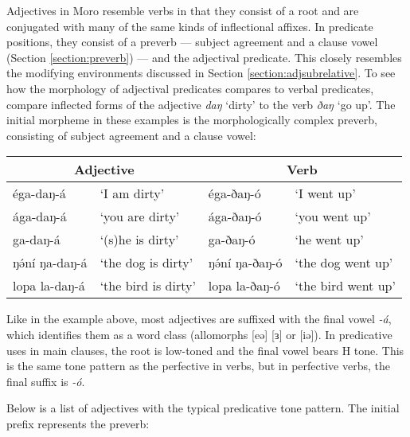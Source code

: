 Adjectives in Moro resemble verbs in that they consist of a root and are conjugated with many of the same kinds of inflectional affixes. In predicate positions, they consist of a preverb --- subject agreement and a clause vowel (Section \ref{section:preverb}) --- and the adjectival predicate. This closely resembles the modifying environments discussed in Section \ref{section:adjsubrelative}. To see how the morphology of adjectival predicates compares to verbal predicates, compare inflected forms of the adjective \textit{daŋ} ‘dirty’ to the verb \textit{ðaŋ} ‘go up’. The initial morpheme in these examples is the morphologically complex preverb, consisting of subject agreement and a clause vowel:

\ea 
\begin{tabular}[t]{llll}
	\multicolumn{2}{c}{Adjective} 	& 	\multicolumn{2}{c}{Verb} \\
	\midrule
	éga-daŋ-á	& ‘I am dirty’ & 	éga-ðaŋ-ó	& ‘I went up’\\
	ága-daŋ-á	& ‘you are dirty’	& ága-ðaŋ-ó	& ‘you went up’\\
	ga-daŋ-á	& ‘(s)he is dirty’	& ga-ðaŋ-ó	& ‘he went up’	\\
	ŋə́ní ŋa-daŋ-á	 & ‘the dog is dirty’	& ŋə́ní ŋa-ðaŋ-ó	& ‘the dog went up’\\
	lopa la-daŋ-á	& ‘the bird is dirty’	& lopa la-ðaŋ-ó	& ‘the bird went up’\\
\end{tabular}
\z 

Like in the example above, most adjectives are suffixed with the final vowel \textit{-á}, which identifies them as a word class (allomorphs [eə] [ɜ] or [iə]). In predicative uses in main clauses, the root is low-toned and the final vowel bears H tone. This is the same tone pattern as the perfective in verbs, but in perfective verbs, the final suffix is \textit{-ó}.  

Below is a list of adjectives with the typical predicative tone pattern. The initial prefix represents the preverb:

